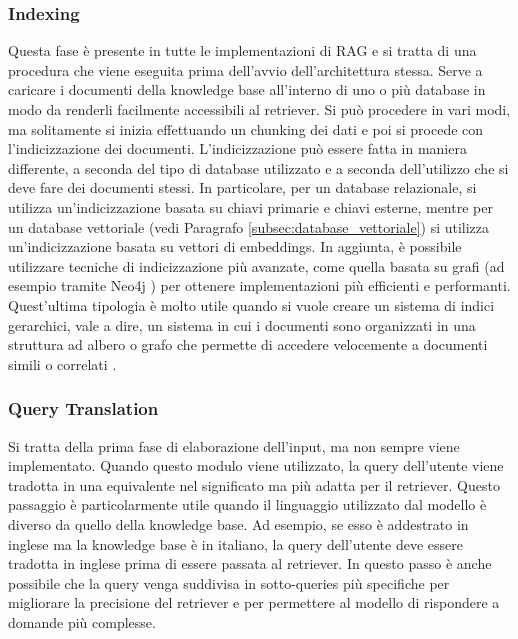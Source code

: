 \subsubsection{Indexing}
Questa fase è presente in tutte le implementazioni di RAG e si tratta di una procedura che viene eseguita prima dell'avvio dell'architettura stessa. Serve a caricare i documenti della knowledge base all'interno di uno o più database in modo da renderli facilmente accessibili al retriever. Si può procedere in vari modi, ma solitamente si inizia effettuando un chunking dei dati e poi si procede con l'indicizzazione dei documenti. L'indicizzazione può essere fatta in maniera differente, a seconda del tipo di database utilizzato e a seconda dell'utilizzo che si deve fare dei documenti stessi. In particolare, per un database relazionale, si utilizza un'indicizzazione basata su chiavi primarie e chiavi esterne, mentre per un database vettoriale (vedi Paragrafo \ref{subsec:database_vettoriale}) si utilizza un'indicizzazione basata su vettori di embeddings. In aggiunta, è possibile utilizzare tecniche di indicizzazione più avanzate, come quella basata su grafi (ad esempio tramite Neo4j \cite{neo4j}) per ottenere implementazioni più efficienti e performanti. Quest'ultima tipologia è molto utile quando si vuole creare un sistema di indici gerarchici, vale a dire, un sistema in cui i documenti sono organizzati in una struttura ad albero o grafo che permette di accedere velocemente a documenti simili o correlati \cite{forer2024inferringscientificcrossdocumentcoreference}.

\subsubsection{Query Translation}
Si tratta della prima fase di elaborazione dell'input, ma non sempre viene implementato. Quando questo modulo viene utilizzato, la query dell'utente viene tradotta in una equivalente nel significato ma più adatta per il retriever. Questo passaggio è particolarmente utile quando il linguaggio utilizzato dal modello è diverso da quello della knowledge base. Ad esempio, se esso è addestrato in inglese ma la knowledge base è in italiano, la query dell'utente deve essere tradotta in inglese prima di essere passata al retriever. In questo passo è anche possibile che la query venga suddivisa in sotto-queries più specifiche per migliorare la precisione del retriever e per permettere al modello di rispondere a domande più complesse.

